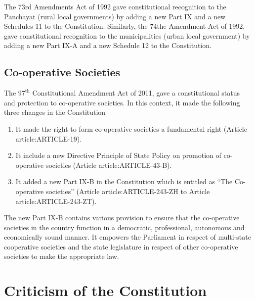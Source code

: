 \begin{multicols}{2}
The 73rd Amendments Act of 1992 gave constitutional recognition to the Panchayat (rural local governments) by adding a new Part IX and a new Schedules 11 to the Constitution. Similarly, the 74the Amendment Act of 1992, gave constitutional recognition to the municipalities (urban local government) by adding a new Part IX-A and a new Schedule 12 to the Constitution.

\subsection{Co-operative Societies}

The $97^{\text{th}}$ Constitutional Amendment Act of 2011, gave a constitutional status and protection to co-operative societies. In this context, it made the following three changes in the Constitution

\begin{enumerate}
  \item It made the right to form co-operative societies a fundamental right (Article \gls{article:ARTICLE-19}).
  \item It include a new Directive Principle of State Policy on promotion of co-operative societies (Article \gls{article:ARTICLE-43-B}).
  \item It added a new Part IX-B in the Constitution which is entitled as ``The Co-operative societies'' (Article \gls{article:ARTICLE-243-ZH} to Article \gls{article:ARTICLE-243-ZT}).
\end{enumerate}

The new Part IX-B contains various provision to ensure that the co-operative societies in the country function in a democratic, professional, autonomous and economically sound manner. It empowers the Parliament in respect of multi-state cooperative societies and the state legislature in respect of other co-operative societies to make the appropriate law.

\section{Criticism of the Constitution}


\end{multicols}
